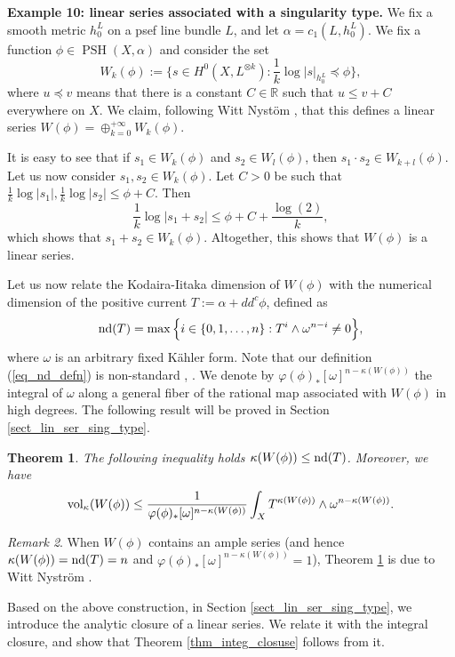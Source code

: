 \documentclass[12pt]{article}
\numberwithin{equation}{section}
\theoremstyle{theorem}
\newtheorem{thm}{Theorem}[section]
\theoremstyle{definition}
\theoremstyle{remark}
\newtheorem{rem}[thm]{Remark}
\newcommand{\real}{\mathbb{R}}
\newcommand{\psh}{\operatorname{PSH}}
\begin{document}
	\par 
	\textbf{Example 10: linear series associated with a singularity type.}
	We fix a smooth metric $h^L_0$ on a psef line bundle $L$, and let $\alpha = c_1(L, h^L_0)$.
	We fix a function $\phi \in \psh(X, \alpha)$ and consider the set
	\begin{equation}\label{eq_wkphi_defn}
		W_k(\phi) := \Big\{
			s \in H^0(X, L^{\otimes k}) : \frac{1}{k} \log |s|_{h^L_0} \preceq \phi
		\Big\},
	\end{equation}
	where $u \preceq v$ means that there is a constant $C \in \real$ such that $u \leq v + C$ everywhere on $X$.
	We claim, following Witt Nyst\"om \cite[\S 2.2]{WittNystromCanGrowth}, that this defines a linear series $W(\phi) = \oplus_{k = 0}^{+\infty} W_k(\phi)$.
	\par 
	It is easy to see that if $s_1 \in W_k(\phi)$ and $s_2 \in W_l(\phi)$, then $s_1 \cdot s_2 \in W_{k + l}(\phi)$.
	Let us now consider $s_1, s_2 \in W_k(\phi)$. 
	Let $C > 0$ be such that $\frac{1}{k} \log |s_1|,  \frac{1}{k} \log |s_2| \leq \phi + C$.
	Then
	\begin{equation}
		 \frac{1}{k} \log |s_1 + s_2| \leq \phi + C + \frac{\log(2)}{k},
	\end{equation}
	which shows that $s_1 + s_2 \in W_k(\phi)$.
	Altogether, this shows that $W(\phi)$ is a linear series.
	\par 
	Let us now relate the Kodaira-Iitaka dimension of $W(\phi)$ with the numerical dimension of the positive current $T := \alpha + dd^c \phi$, defined as
	\begin{equation}\label{eq_nd_defn}
		{\rm{nd}}(T)
		=
		\max\Big\{
				i \in \{ 0, 1, \ldots, n \} :  T^{i} \wedge \omega^{n - i} \neq 0
		\Big\},
	\end{equation}
	where $\omega$ is an arbitrary fixed K\"ahler form.
	Note that our definition (\ref{eq_nd_defn}) is non-standard \cite{DemaillyOnCohPSEF}, \cite{CaoNumDim}.
	We denote by $\varphi(\phi)_* [\omega]^{n - \kappa(W(\phi))}$ the integral of $\omega$ along a general fiber of the rational map associated with $W(\phi)$ in high degrees.
	The following result will be proved in Section \ref{sect_lin_ser_sing_type}.
	\begin{thm}\label{thm_kappa_wphi}
		The following inequality holds $\kappa(W(\phi)) \leq {\rm{nd}}(T)$.
		Moreover, we have
		\begin{equation}
			{\rm{vol}}_{\kappa}(W(\phi))
			\leq
			\frac{1}{\varphi(\phi)_{*} [\omega]^{n - \kappa(W(\phi))}} \int_X T^{\kappa(W(\phi))} \wedge \omega^{n - \kappa(W(\phi))}.
		\end{equation}
	\end{thm}
	\begin{rem}
		When $W(\phi)$ contains an ample series (and hence $\kappa(W(\phi)) = {\rm{nd}}(T) = n$ and $\varphi(\phi)_{*} [\omega]^{n - \kappa(W(\phi))} = 1$), Theorem \ref{thm_kappa_wphi} is due to Witt Nystr\"om \cite[Theorem 2.20]{WittNystromCanGrowth}.
	\end{rem}
	Based on the above construction, in Section \ref{sect_lin_ser_sing_type}, we introduce the analytic closure of a linear series.
	We relate it with the integral closure, and show that Theorem \ref{thm_integ_closuse} follows from it.
\end{document}
